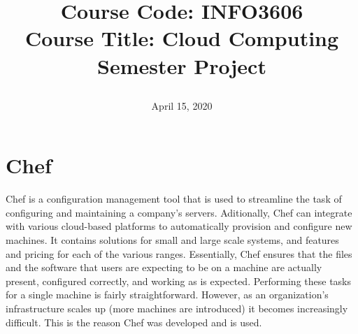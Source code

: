 \documentclass[a4paper, 12pt]{article}
\begin{document}
\title{
		\textbf{Course Code:} INFO3606\\
		\textbf{Course Title:} Cloud Computing\\
		\textbf{Semester Project}
		\date{April 15, 2020}
}
\maketitle

\newpage
{}

\tableofcontents

\newpage
\section{Chef}
Chef is a configuration management tool that is used to streamline the task of configuring and maintaining a company's servers. Aditionally, Chef can integrate with various cloud-based platforms to automatically provision and configure new machines. It contains solutions for small and large scale systems, and features and pricing for each of the various ranges. Essentially, Chef ensures that the files and the software that users are expecting to be on a machine are actually present, configured correctly, and working as is expected. Performing these tasks for a single machine is fairly straightforward. However, as an organization's infrastructure scales up (more machines are introduced) it becomes increasingly difficult. This is the reason Chef was developed and is used.
\end{document}
